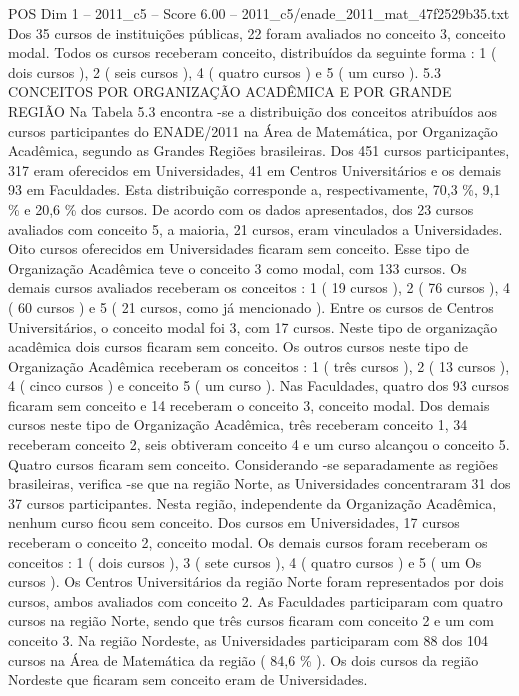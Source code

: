 \begin{textsample}{POS Dim 1 – 2011\_c5 – Score 6.00 – 2011\_c5/enade\_2011\_mat\_47f2529b35.txt}
Dos 35 cursos de instituições públicas, 22 foram avaliados no conceito 3, conceito modal.
Todos os cursos receberam conceito, distribuídos da seguinte forma : 1 ( dois cursos ), 2 ( seis cursos ), 4 ( quatro cursos ) e 5 ( um curso ). 5.3 CONCEITOS POR ORGANIZAÇÃO ACADÊMICA E POR GRANDE REGIÃO Na Tabela 5.3 encontra -se a distribuição dos conceitos atribuídos aos cursos participantes do ENADE/2011 na Área de Matemática, por Organização Acadêmica, segundo as Grandes Regiões brasileiras.
Dos 451 cursos participantes, 317 eram oferecidos em Universidades, 41 em Centros Universitários e os demais 93 em Faculdades.
Esta distribuição corresponde a, respectivamente, 70,3 \%, 9,1 \% e 20,6 \% dos cursos.
De acordo com os dados apresentados, dos 23 cursos avaliados com conceito 5, a maioria, 21 cursos, eram vinculados a Universidades.
Oito cursos oferecidos em Universidades ficaram sem conceito.
Esse tipo de Organização Acadêmica teve o conceito 3 como modal, com 133 cursos.
Os demais cursos avaliados receberam os conceitos : 1 ( 19 cursos ), 2 ( 76 cursos ), 4 ( 60 cursos ) e 5 ( 21 cursos, como já mencionado ).
Entre os cursos de Centros Universitários, o conceito modal foi 3, com 17 cursos.
Neste tipo de organização acadêmica dois cursos ficaram sem conceito.
Os outros cursos neste tipo de Organização Acadêmica receberam os conceitos : 1 ( três cursos ), 2 ( 13 cursos ), 4 ( cinco cursos ) e conceito 5 ( um curso ).
Nas Faculdades, quatro dos 93 cursos ficaram sem conceito e 14 receberam o conceito 3, conceito modal.
Dos demais cursos neste tipo de Organização Acadêmica, três receberam conceito 1, 34 receberam conceito 2, seis obtiveram conceito 4 e um curso alcançou o conceito 5.
Quatro cursos ficaram sem conceito.
Considerando -se separadamente as regiões brasileiras, verifica -se que na região Norte, as Universidades concentraram 31 dos 37 cursos participantes.
Nesta região, independente da Organização Acadêmica, nenhum curso ficou sem conceito.
Dos cursos em Universidades, 17 cursos receberam o conceito 2, conceito modal.
Os demais cursos foram receberam os conceitos : 1 ( dois cursos ), 3 ( sete cursos ), 4 ( quatro cursos ) e 5 ( um Os cursos ).
Os Centros Universitários da região Norte foram representados por dois cursos, ambos avaliados com conceito 2.
As Faculdades participaram com quatro cursos na região Norte, sendo que três cursos ficaram com conceito 2 e um com conceito 3.
Na região Nordeste, as Universidades participaram com 88 dos 104 cursos na Área de Matemática da região ( 84,6 \% ).
Os dois cursos da região Nordeste que ficaram sem conceito eram de Universidades.

\end{textsample}
